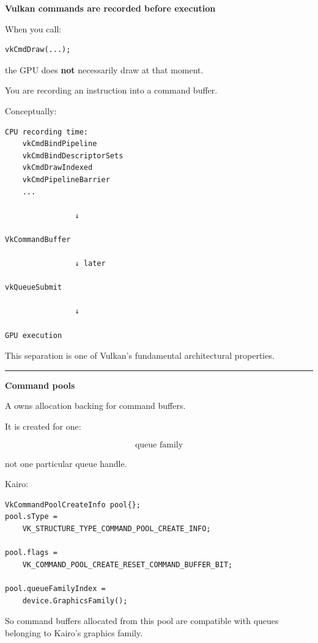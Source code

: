 \hypertarget{01-foundations-i-ch014-command-pools-command-buffers-submission-semaphores}{}

\textbf{Vulkan commands are recorded before execution}

When you call:

\begin{verbatim}
vkCmdDraw(...);
\end{verbatim}

the GPU does \textbf{not} necessarily draw at that moment.

You are recording an instruction into a command buffer.

Conceptually:

\begin{verbatim}
CPU recording time:
    vkCmdBindPipeline
    vkCmdBindDescriptorSets
    vkCmdDrawIndexed
    vkCmdPipelineBarrier
    ...

                ↓

VkCommandBuffer

                ↓ later

vkQueueSubmit

                ↓

GPU execution
\end{verbatim}

This separation is one of Vulkan's fundamental architectural properties.

\begin{center}\rule{0.5\linewidth}{0.5pt}\end{center}

\textbf{Command pools}

A  owns allocation backing for command buffers.

It is created for one:

\[
\boxed{\text{queue family}}
\]

not one particular queue handle.

Kairo:

\begin{verbatim}
VkCommandPoolCreateInfo pool{};
pool.sType =
    VK_STRUCTURE_TYPE_COMMAND_POOL_CREATE_INFO;

pool.flags =
    VK_COMMAND_POOL_CREATE_RESET_COMMAND_BUFFER_BIT;

pool.queueFamilyIndex =
    device.GraphicsFamily();
\end{verbatim}

So command buffers allocated from this pool are compatible with queues belonging to Kairo's graphics family.

